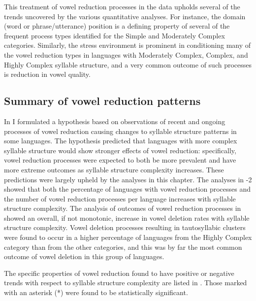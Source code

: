   This treatment of vowel reduction processes in the data upholds several of the trends uncovered by the various quantitative analyses. For instance, the domain (word or phrase/utterance) position is a defining property of several of the frequent process types identified for the Simple and Moderately Complex categories. Similarly, the stress environment is prominent in conditioning many of the vowel reduction types in languages with Moderately Complex, Complex, and Highly Complex syllable structure, and a very common outcome of such processes is reduction in vowel quality.

\subsection{Summary of vowel reduction patterns}\label{sec:6.3.7}

  In  I formulated a hypothesis based on observations of recent and ongoing processes of vowel reduction causing changes to syllable structure patterns in some languages. The hypothesis predicted that languages with more complex syllable structure would show stronger effects of vowel reduction: specifically, vowel reduction processes were expected to both be more prevalent and have more extreme outcomes as syllable structure complexity increases. These predictions were largely upheld by the analyses in this chapter. The analyses in -2 showed that both the percentage of languages with vowel reduction processes and the number of vowel reduction processes per language increases with syllable structure complexity. The analysis of outcomes of vowel reduction processes in  showed an overall, if not monotonic, increase in vowel deletion rates with syllable structure complexity. Vowel deletion processes resulting in tautosyllabic clusters were found to occur in a higher percentage of languages from the Highly Complex category than from the other categories, and this was by far the most common outcome of vowel deletion in this group of languages.

  The specific properties of vowel reduction found to have positive or negative trends with respect to syllable structure complexity are listed in . Those marked with an asterisk (*) were found to be statistically significant.

